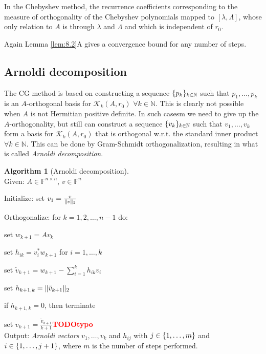 \documentclass[12pt]{article}
\theoremstyle{definition}
\newtheorem{algorithm}[theorem]{Algorithm}
\theoremstyle{remark}
\numberwithin{equation}{section}
\newcommand{\F}{\mathbb{F}}
\newcommand{\N}{\mathbb{N}}
\newcommand{\K}{\mathcal{K}}
\newcommand{\TODO}[1][]{\textcolor{red}{\textbf{TODO\ifblank{#1}{}{:\ }#1}}\\}
\DeclarePairedDelimiter{\norm}{\lVert}{\rVert}
\DeclarePairedDelimiter{\set}{\{}{\}}
\begin{document}
  In the Chebyshev method, the recurrence coefficients corresponding to the measure of orthogonality of the Chebyshev polynomials mapped to $[\lambda, \Lambda]$, whose only relation to $A$ is through $\lambda$ and $\Lambda$ and which is independent of $r_0$.

  Again Lemma \ref{lem:8.2}A gives a convergence bound for any number of steps.

  \subsection*{Arnoldi decomposition}
  The CG method is based on constructing a sequence $\set{p_k}_{k \in \N}$ such that $p_1, \ldots, p_k$ is an $A$-orthogonal basis for $\K_k(A,r_0)$ $\forall k \in \N$. This is clearly not possible when $A$ is not Hermitian positive definite. In such casesm we need to give up the $A$-orthogonality, but still can construct a sequence $\set{v_k}_{k \in \N}$ such that $v_1, \ldots, v_k$ form a basis for $\K_k(A,r_0)$ that is orthogonal w.r.t. the standard inner product $\forall k \in \N$. This can be done by Gram-Schmidt orthogonalization, resulting in what is called \emph{Arnoldi decomposition}.
  \begin{algorithm}[Arnoldi decomposition]~\\[\parskip]
    \label{alg:9.6}
    Given: $A \in \F^{n\times n}$, $v \in \F^n$

    Initialize: set $v_1 = \frac{v}{\norm{v}_2}$

    Orthogonalize: for $k = 1,2,\ldots, n-1$ do:

    \hspace{2em} set $w_{k+1} = A v_k$

    \hspace{2em} set $h_{ik} = v_i^* w_{k+1}$ for $i = 1,\ldots,k$

    \hspace{2em} set $\tilde{v}_{k+1} = w_{k+1} - \sum_{i=1}^k h_{ik} v_i$

    \hspace{2em} set $h_{k+1,k} = \norm{\tilde{v}_{k+1}}_2$

    \hspace{2em} if $h_{k+1,k} = 0$, then terminate

    \hspace{2em} set $v_{k+1} = \frac{\tilde{v}_{k+1}}{k+1}$\TODO[typo]

    Output: \emph{Arnoldi vectors} $v_1, \ldots, v_k$ and $h_{ij}$ with $j \in \set{1,\ldots,m}$ and $i \in \set{1,\ldots,j+1}$, where $m$ is the number of steps performed.
  \end{algorithm}
\end{document}
